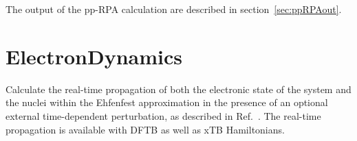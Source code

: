 The output of the pp-RPA calculation are described in
section~\ref{sec:ppRPAout}.


\section{ElectronDynamics}

\label{sec:dftbp.ElectronDynamics}

Calculate the real-time propagation of both the electronic state of the system
and the nuclei within the Ehfenfest approximation in the presence of an optional
external time-dependent perturbation, as described in Ref.~\cite{realtime1}.
The real-time propagation is available with DFTB as well as xTB Hamiltonians.

